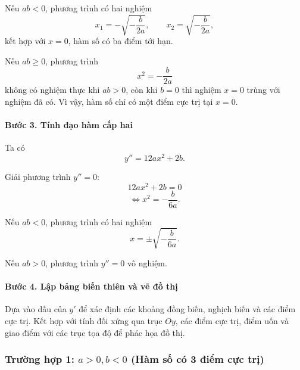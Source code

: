 \begin{itemize}
Nếu $ab<0$, phương trình có hai nghiệm
\[
x_1=-\sqrt{-\frac{b}{2a}},
\qquad
x_2=\sqrt{-\frac{b}{2a}},
\]
kết hợp với $x=0$, hàm số có ba điểm tới hạn.

Nếu $ab\geq 0$, phương trình
\[
x^2=-\frac{b}{2a}
\]
không có nghiệm thực khi $ab>0$, còn khi $b=0$ thì nghiệm $x=0$
trùng với nghiệm đã có. Vì vậy, hàm số chỉ có một điểm cực trị tại
$x=0$.


\paragraph{Bước 3. Tính đạo hàm cấp hai}

Ta có
\[
y''=12ax^2+2b.
\]

Giải phương trình $y''=0$:
\[
12ax^2+2b=0
\]
\[
\Leftrightarrow
x^2=-\frac{b}{6a}.
\]

Nếu $ab<0$, phương trình có hai nghiệm
\[
x=\pm\sqrt{-\frac{b}{6a}}.
\]

Nếu $ab>0$, phương trình $y''=0$ vô nghiệm.


\paragraph{Bước 4. Lập bảng biến thiên và vẽ đồ thị}

Dựa vào dấu của $y'$ để xác định các khoảng đồng biến,
nghịch biến và các điểm cực trị. Kết hợp với tính đối xứng qua
trục $Oy$, các điểm cực trị, điểm uốn và giao điểm với các trục
tọa độ để phác họa đồ thị.



\subsubsection*{Trường hợp 1: $a > 0, b < 0$ (Hàm số có 3 điểm cực trị)}

\begin{center}
\end{center}


\end{itemize}
